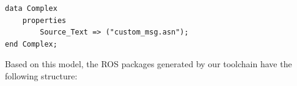 \begin{lstlisting}[frame=tb,caption={AADL representation of a custom message},label=lst:aadl_custom_msgs]
data Complex
 	properties
 		Source_Text => ("custom_msg.asn");
end Complex;
\end{lstlisting}


Based on this model, the ROS packages generated by our toolchain have the following structure:








